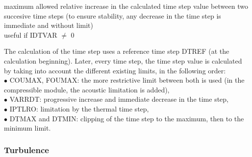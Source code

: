 {maximum allowed relative increase in the calculated time step value
between two succesive time steps (to ensure stability, any decrease in the time step
is immediate and without limit)\\
useful if IDTVAR $\ne$ 0}


The calculation of the time step uses a reference time step DTREF (at
the calculation beginning). Later, every time step, the time step value
is calculated by taking into account the different existing limits, in
the following order: \\
\hspace*{1.cm}$\bullet$ COUMAX, FOUMAX: the more restrictive limit between
both is used (in the compressible module, the acoustic limitation is added),\\
\hspace*{1.cm}$\bullet$ VARRDT:  progressive increase and immediate
decrease in the time step,\\ 
\hspace*{1.cm}$\bullet$ IPTLRO: limitation by the thermal time step,\\
\hspace*{1.cm}$\bullet$ DTMAX and DTMIN: clipping of the time step to
the maximum, then to the minimum limit.\\


\subsubsection{Turbulence}

